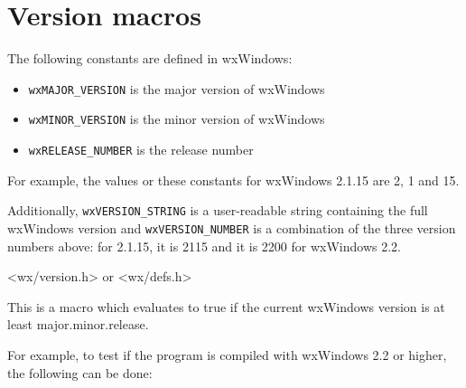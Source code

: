 \\
\\
\\
\\
\\
\\
\\
\\
\\
\\

\section{Version macros}\label{versionfunctions}

The following constants are defined in wxWindows:

\begin{itemize}\itemsep=0pt
\item {\tt wxMAJOR\_VERSION} is the major version of wxWindows
\item {\tt wxMINOR\_VERSION} is the minor version of wxWindows
\item {\tt wxRELEASE\_NUMBER} is the release number
\end{itemize}

For example, the values or these constants for wxWindows 2.1.15 are 2, 1 and
15.

Additionally, {\tt wxVERSION\_STRING} is a user-readable string containing
the full wxWindows version and {\tt wxVERSION\_NUMBER} is a combination of the
three version numbers above: for 2.1.15, it is 2115 and it is 2200 for
wxWindows 2.2.


<wx/version.h> or <wx/defs.h>

\label{wxcheckversion}


This is a macro which evaluates to true if the current wxWindows version is at
least major.minor.release.

For example, to test if the program is compiled with wxWindows 2.2 or higher,
the following can be done:

